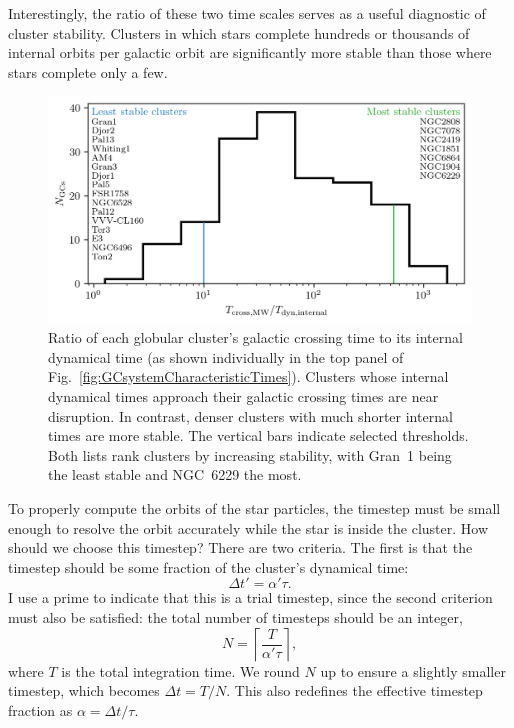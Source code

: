        Interestingly, the ratio of these two time scales serves as a useful diagnostic of cluster stability. Clusters in which stars complete hundreds or thousands of internal orbits per galactic orbit are significantly more stable than those where stars complete only a few. 
        \begin{figure}
            \centering
            \includegraphics[width=\linewidth]{images/GCsystemStabilityDynamicalTimeRatios.png}
            \caption[Ratio of the globular clusters' internal dynamical times to their Galactic crossing time.]{Ratio of each globular cluster's galactic crossing time to its internal dynamical time (as shown individually in the top panel of Fig.~\ref{fig:GCsystemCharacteristicTimes}). Clusters whose internal dynamical times approach their galactic crossing times are near disruption. In contrast, denser clusters with much shorter internal times are more stable. The vertical bars indicate selected thresholds. Both lists rank clusters by increasing stability, with Gran~1 being the least stable and NGC~6229 the most.}
            \label{fig:GCsystemStabilityDynamicalTimeRatios}
        \end{figure}
        
        To properly compute the orbits of the star particles, the timestep must be small enough to resolve the orbit accurately while the star is inside the cluster. How should we choose this timestep? There are two criteria. The first is that the timestep should be some fraction of the cluster's dynamical time:
        \begin{equation}
            \Delta t' = \alpha ' \tau.
        \end{equation}
        I use a prime to indicate that this is a trial timestep, since the second criterion must also be satisfied: the total number of timesteps should be an integer, 
        \[
            N = \left\lceil \frac{T}{\alpha' \tau} \right\rceil,
        \]
        where $T$ is the total integration time. We round $N$ up to ensure a slightly smaller timestep, which becomes $\Delta t = T/N$. This also redefines the effective timestep fraction as $\alpha = \Delta t / \tau$.

